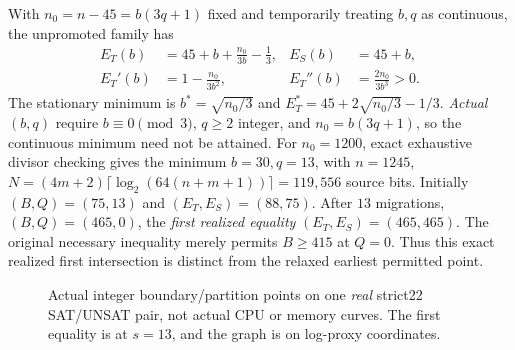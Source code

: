 \documentclass[10pt]{article}
\begin{document}
\noindent With $n_0=n-45=b(3q+1)$ fixed and temporarily treating $b,q$ as continuous, the unpromoted family has
\begin{align}
 E_T(b)&=45+b+\frac{n_0}{3b}-\frac13,& E_S(b)&=45+b,\\
 E_T'(b)&=1-\frac{n_0}{3b^2},& E_T''(b)&=\frac{2n_0}{3b^3}>0.
\end{align}
The stationary minimum is $b^*=\sqrt{n_0/3}$ and $E_T^*=45+2\sqrt{n_0/3}-1/3$. \emph{Actual} $(b,q)$ require $b\equiv0\pmod3$, $q\ge2$ integer, and $n_0=b(3q+1)$, so the continuous minimum need not be attained. For $n_0=1200$, exact exhaustive divisor checking gives the minimum $b=30,q=13$, with $n=1245$, $N=(4m+2)\lceil\log_2(64(n+m+1))\rceil=119{,}556$ source bits. Initially $(B,Q)=(75,13)$ and $(E_T,E_S)=(88,75)$. After $13$ migrations, $(B,Q)=(465,0)$, the \emph{first realized equality} $(E_T,E_S)=(465,465)$. The original necessary inequality merely permits $B\ge415$ at $Q=0$. Thus this exact realized first intersection is distinct from the relaxed earliest permitted point.

\begin{figure}[ht]
\centering
{}
\caption{Actual integer boundary/partition points on one \emph{real} strict22 SAT/UNSAT pair, not actual CPU or memory curves. The first equality is at $s=13$, and the graph is on log-proxy coordinates.}
\end{figure}
\end{document}
